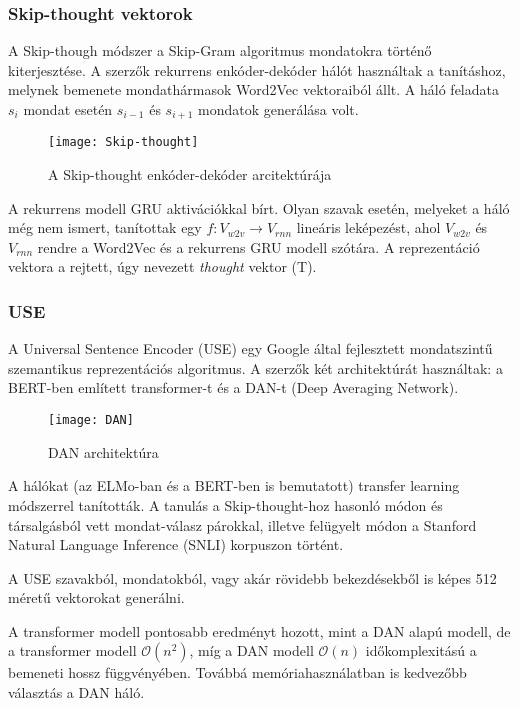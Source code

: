 \subsubsection{Skip-thought vektorok}
A Skip-though módszer a Skip-Gram algoritmus mondatokra történő kiterjesztése. A szerzők rekurrens enkóder-dekóder hálót használtak a tanításhoz, melynek bemenete mondathármasok Word2Vec vektoraiból állt. A háló feladata $s_i$ mondat esetén $s_{i-1}$ és $s_{i+1}$ mondatok generálása volt.

\begin{figure}[H]
	\centering
	\texttt{[image: Skip-thought]}
	\caption{A Skip-thought enkóder-dekóder arcitektúrája}
\end{figure}

A rekurrens modell GRU aktivációkkal bírt.
Olyan szavak esetén, melyeket a háló még nem ismert, tanítottak egy $f:V_{w2v} \rightarrow V_{rnn}$ lineáris leképezést, ahol $V_{w2v}$ és $V_{rnn}$ rendre a Word2Vec és a rekurrens GRU modell szótára. A reprezentáció vektora a rejtett, úgy nevezett \textit{thought} vektor (T).

\subsubsection{USE}
A Universal Sentence Encoder (USE) egy Google által fejlesztett mondatszintű szemantikus reprezentációs algoritmus. A szerzők két architektúrát használtak: a BERT-ben említett transformer-t és a DAN-t (Deep Averaging Network). 

\begin{figure}[H]
	\centering
	\texttt{[image: DAN]}
	\caption{DAN architektúra}
\end{figure}

A hálókat (az ELMo-ban és a BERT-ben is bemutatott) transfer learning módszerrel tanították. A tanulás a Skip-thought-hoz hasonló módon és társalgásból vett mondat-válasz párokkal, illetve felügyelt módon a Stanford Natural Language Inference (SNLI) korpuszon történt.

A USE szavakból, mondatokból, vagy akár rövidebb bekezdésekből is képes 512 méretű vektorokat generálni.

A transformer modell pontosabb eredményt hozott, mint a DAN alapú modell, de a transformer modell $\mathcal{O}(n^2)$, míg a DAN modell $\mathcal{O}(n)$ időkomplexitású a bemeneti hossz függvényében. Továbbá memóriahasználatban is kedvezőbb választás a DAN háló.

